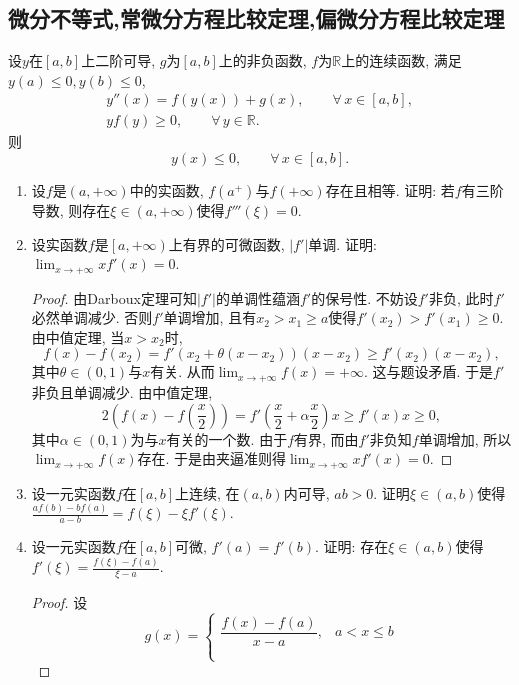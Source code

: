 \subsection{微分不等式,常微分方程比较定理,偏微分方程比较定理}
\begin{theorem}\label{D64}
设\(y\)在\([a,b]\)上二阶可导, \(g\)为\([a,b]\)上的非负函数, 
\(f\)为\(\mathbb{R}\)上的连续函数, 满足\(y(a)\leqslant 0,y(b)\leqslant 0\),
\begin{gather*}
y''(x)=f(y(x))+g(x),\qquad\forall\, x\in[a,b],\\
yf(y)\geqslant 0,\qquad\forall\, y\in\mathbb{R}.
\end{gather*}则
\[y(x)\leqslant 0,\qquad\forall\, x\in[a,b].\]
\end{theorem}
\begin{4a}
\begin{enumerate}
\item 设\(f\)是\((a,+\infty)\)中的实函数, \(f(a^+)\)与\(f(+\infty)\)存在且相等. 
证明: 若\(f\)有三阶导数, 则存在\(\xi\in(a,+\infty)\)使得\(f'''(\xi)=0\).
\item 设实函数\(f\)是\(\left[a,+\infty\right)\)上有界的可微函数, \(|f'|\)单调. 
证明:\(\lim_{x\rightarrow+\infty}xf'(x)=0.\)
\begin{proof}
由Darboux定理可知\(|f'|\)的单调性蕴涵\(f'\)的保号性. 
不妨设\(f'\)非负, 此时\(f'\)必然单调减少. 
否则\(f'\)单调增加, 且有\(x_2>x_1\geqslant a\)使得\(f'(x_2)>f'(x_1)\geqslant 0\). 
由中值定理, 当\(x>x_2\)时,
\[f(x)-f(x_2)=f'(x_2+\theta (x-x_2))(x-x_2)\geqslant f'(x_2)(x-x_2),\]
其中\(\theta\in(0,1)\)与\(x\)有关. 从而\(\lim_{x\rightarrow+\infty}f(x)=+\infty\). 
这与题设矛盾. 于是\(f'\)非负且单调减少. 由中值定理,
\[2\left(f(x)-f\left(\frac{x}{2}\right)\right)
=f'\left(\frac{x}{2}+\alpha\frac{x}{2}\right)x\geqslant f'(x)x\geqslant 0,\]
其中\(\alpha\in(0,1)\)为与\(x\)有关的一个数. 
由于\(f\)有界, 而由\(f'\)非负知\(f\)单调增加, 
所以\(\lim_{x\rightarrow+\infty}f(x)\)存在. 
于是由夹逼准则得\(\lim_{x\rightarrow+\infty}xf'(x)=0.\)
\end{proof}
\item 设一元实函数\(f\)在\([a,b]\)上连续, 在\((a,b)\)内可导, \(ab>0\). 
证明\(\xi\in (a,b)\)使得\(\frac{af(b)-bf(a)}{a-b}=f(\xi)-\xi f'(\xi).\)
\item 设一元实函数\(f\)在\([a,b]\)可微, \(f'(a)=f'(b)\). 
证明: 存在\(\xi\in (a,b)\)使得\(f'(\xi)=\frac{f(\xi)-f(a)}{\xi-a}.\)
\begin{proof}
设
\[g(x)=\begin{cases}\dfrac{f(x)-f(a)}{x-a},& a<x \leqslant b \\ \\

\end{cases}\]
\end{proof}
\end{enumerate}
\end{4a}
